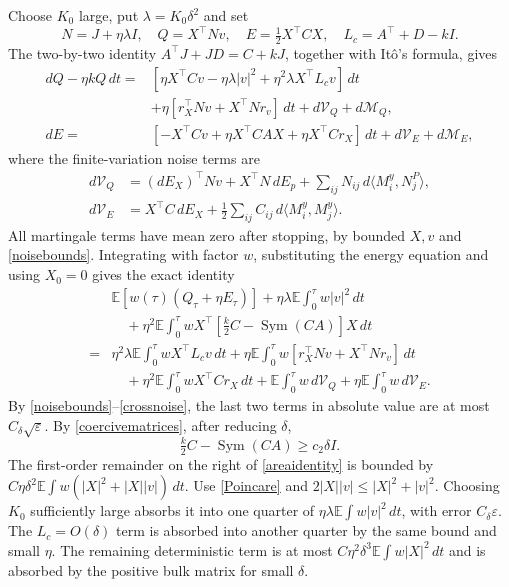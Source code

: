 \documentclass[11pt,a4paper]{article}
\newcommand{\E}{\mathbb E}
\newcommand{\Sym}{\operatorname{Sym}}
\newcommand{\dt}{\,dt}
\begin{document}
Choose $K_0$ large, put $\lambda=K_0\delta^2$ and set
\[
 N=J+\eta\lambda I,\quad Q=X^\top Nv,\quad
 E=\tfrac12X^\top CX,\quad L_c=A^\top+D-kI.
\]
The two-by-two identity $A^\top J+JD=C+kJ$, together with It\^o's
formula, gives
\[
 \begin{split}
 dQ-\eta kQ\dt={}&[\eta X^\top Cv-\eta\lambda|v|^2
                   +\eta^2\lambda X^\top L_cv]\dt\\
 &+\eta[r_X^\top Nv+X^\top Nr_v]\dt+d\mathcal V_Q+d\mathcal M_Q,\\
 dE={}&[-X^\top Cv+\eta X^\top CAX+\eta X^\top Cr_X]\dt
                           +d\mathcal V_E+d\mathcal M_E,
 \end{split}
\]
where the finite-variation noise terms are
\[
 \begin{split}
 d\mathcal V_Q&=(dE_X)^\top Nv+X^\top N\,dE_p
                  +\sum_{ij}N_{ij}\,d\langle M_i^y,N_j^P\rangle,\\
 d\mathcal V_E&=X^\top C\,dE_X
                  +\tfrac12\sum_{ij}C_{ij}\,d\langle M_i^y,M_j^y\rangle.
 \end{split}
\]
All martingale terms have mean zero after stopping, by bounded
$X,v$ and \eqref{noisebounds}.
Integrating with factor $w$, substituting the energy equation and using
$X_0=0$ gives the exact identity
\begin{equation}\label{areaidentity}
 \begin{split}
 &\E[w(\tau)(Q_\tau+\eta E_\tau)]
     +\eta\lambda\E\int_0^\tau w|v|^2\dt\\
 &\quad+\eta^2\E\int_0^\tau
       wX^\top[\tfrac{k}{2}C-\Sym(CA)]X\dt\\
 ={}&\eta^2\lambda\E\int_0^\tau wX^\top L_cv\dt
   +\eta\E\int_0^\tau w[r_X^\top Nv+X^\top Nr_v]\dt\\
 &\quad+\eta^2\E\int_0^\tau wX^\top Cr_X\dt
    +\E\int_0^\tau w\,d\mathcal V_Q
    +\eta\E\int_0^\tau w\,d\mathcal V_E.
 \end{split}
\end{equation}
By \eqref{noisebounds}--\eqref{crossnoise}, the last two terms in
absolute value are at most $C_\delta\sqrt\varepsilon$.
By \eqref{coercivematrices}, after reducing $\delta$,
\[
 \tfrac{k}{2}C-\Sym(CA)\geq c_2\delta I.
\]
The first-order remainder on the right of \eqref{areaidentity} is
bounded by $C\eta\delta^2\E\int w(|X|^2+|X||v|)\dt$.
Use \eqref{Poincare} and $2|X||v|\leq|X|^2+|v|^2$.
Choosing $K_0$ sufficiently large absorbs it into one quarter of
$\eta\lambda\E\int w|v|^2\dt$, with error $C_\delta\varepsilon$.
The $L_c=O(\delta)$ term is absorbed into another quarter by the same
bound and small $\eta$. The remaining deterministic term is at most
$C\eta^2\delta^3\E\int w|X|^2\dt$ and is absorbed by the positive
bulk matrix for small $\delta$.
\end{document}
